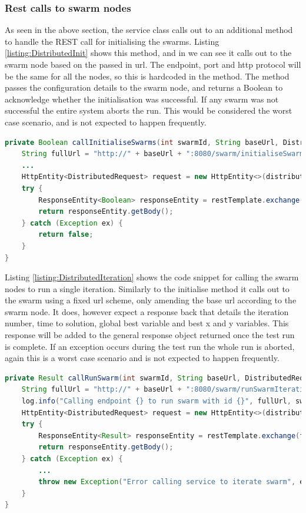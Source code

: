 \documentclass[oneside,12pt]{book}
\begin{document}
\subsubsection{Rest calls to swarm nodes}
As seen in the above section, the service class calls out to an additional method to handle the REST call for initialising the swarms. Listing \ref{listing:DistributedInit} shows this method, and in we can see it calls out to the swarm node based on the passed in url. The endpoint, port and http protocol will be the same for all the nodes, so this is hardcoded in the method. The method passes the configuration details to the swarm node, and returns a Boolean to acknowledge whether the initialisation was successful. If any swarm was not successful the entire system aborts the run. This would be considered the worst case scenario, and is not expected to happen frequently. 

\begin{lstlisting}[basicstyle=\footnotesize, language=Java]
private Boolean callInitialiseSwarms(int swarmId, String baseUrl, DistributedRequest distributedRequest) {
    String fullUrl = "http://" + baseUrl + ":8080/swarm/initialiseSwarm";
    ...
    HttpEntity<DistributedRequest> request = new HttpEntity<>(distributedRequest);
    try {
        ResponseEntity<Boolean> responseEntity = restTemplate.exchange(fullUrl, HttpMethod.POST, request, Boolean.class);
        return responseEntity.getBody();
    } catch (Exception ex) {
        return false;
    }
}
\end{lstlisting}
\label{listing:DistributedInit}

Listing \ref{listing:DistributedIteration} shows the code snippet for calling the swarm nodes to run a single iteration. Similarly to the initialise method it calls out to the swarm using a fixed url scheme, only amending the base url according to the swarm node. It does, however expect a response back that details the iteration number, time to solution, global best variable and best x and y variables. This response will be added to the general response object returned once the test run is complete. If an exception occurs during the test run the whole run is aborted, again this is a worst case scenario and is not expected to happen frequently. 

\begin{lstlisting}[basicstyle=\footnotesize, language=Java]
private Result callRunSwarm(int swarmId, String baseUrl, DistributedRequest distributedRequest) {
    String fullUrl = "http://" + baseUrl + ":8080/swarm/runSwarmIteration";
    log.info("Calling endpoint {} to run swarm with id {}", fullUrl, swarmId);
    HttpEntity<DistributedRequest> request = new HttpEntity<>(distributedRequest);
    try {
        ResponseEntity<Result> responseEntity = restTemplate.exchange(fullUrl, HttpMethod.POST, request, Result.class);
        return responseEntity.getBody();
    } catch (Exception ex) {
        ...
        throw new Exception("Error calling service to iterate swarm", ex);
    }
}
\end{lstlisting}
\label{listing:DistributedIteration}
\end{document}
